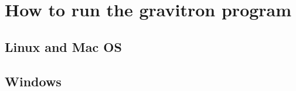 \documentclass{pfpe-manual}
\begin{document}

\section{How to run the gravitron program}
\label{run-gg}

\subsection{Linux and Mac OS}
%

\subsection{Windows}
%
\end{document}
